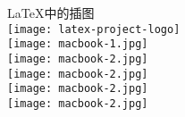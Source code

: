 \documentclass{ctexart}
\begin{document}
	\LaTeX 中的插图 \\
	\texttt{[image: latex-project-logo]} %
	\\
	\texttt{[image: macbook-1.jpg]} %
	\\
	\texttt{[image: macbook-2.jpg]} %
	\\
	\texttt{[image: macbook-2.jpg]} %
	\\
	\texttt{[image: macbook-2.jpg]} %
	\\
	\texttt{[image: macbook-2.jpg]} %
\end{document}
